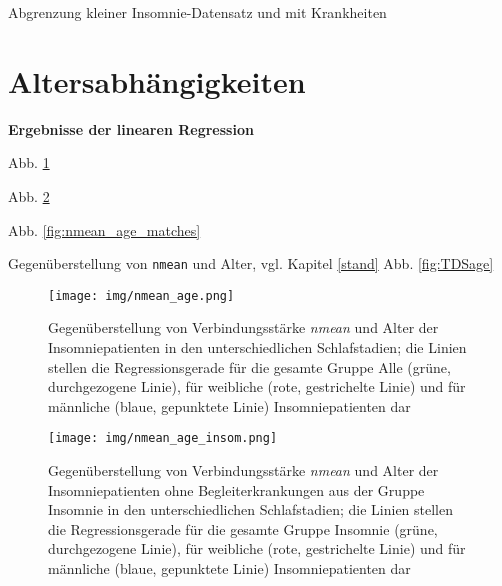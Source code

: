 Abgrenzung kleiner Insomnie-Datensatz und mit Krankheiten\\





\section{Altersabhängigkeiten}


\textbf{Ergebnisse der linearen Regression}

Abb. \ref{fig:nmean_age}

Abb. \ref{fig:nmean_age_insom}

Abb. \ref{fig:nmean_age_matches}

Gegenüberstellung von \texttt{nmean} und Alter, vgl. Kapitel \ref{stand} Abb. \ref{fig:TDSage}


\begin{figure}[H]
	\centering
	\texttt{[image: img/nmean\_age.png]}
	\caption[Gegenüberstellung von Verbindungsstärke \textit{nmean} und Alter von Insomniepatienten]{Gegenüberstellung von Verbindungsstärke \textit{nmean} und Alter der Insomniepatienten in den unterschiedlichen Schlafstadien; die Linien stellen die Regressionsgerade für die gesamte Gruppe Alle (grüne, durchgezogene Linie), für weibliche (rote, gestrichelte Linie) und für männliche (blaue, gepunktete Linie) Insomniepatienten dar}
	\label{fig:nmean_age}
\end{figure}



\begin{figure}[H]
	\centering
	\texttt{[image: img/nmean\_age\_insom.png]}
	\caption[Gegenüberstellung von Verbindungsstärke \textit{nmean} und Alter von Insomniepatienten ohne Begleiterkrankungen]{Gegenüberstellung von Verbindungsstärke \textit{nmean} und Alter der Insomniepatienten ohne Begleiterkrankungen aus der Gruppe Insomnie in den unterschiedlichen Schlafstadien; die Linien stellen die Regressionsgerade für die gesamte Gruppe Insomnie (grüne, durchgezogene Linie), für weibliche (rote, gestrichelte Linie) und für männliche (blaue, gepunktete Linie) Insomniepatienten dar}
	\label{fig:nmean_age_insom}
\end{figure}



